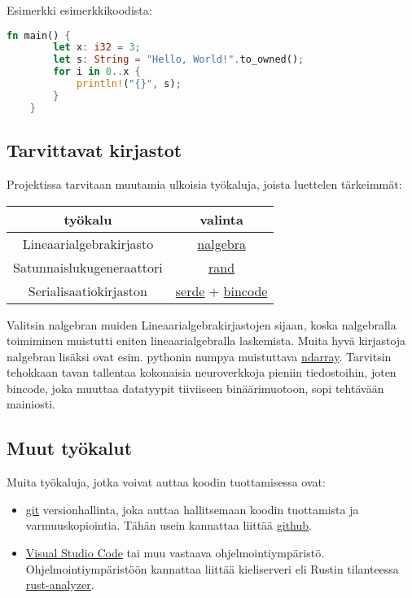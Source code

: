 \documentclass{article}
\begin{document}
Esimerkki esimerkkikoodista:
\begin{lstlisting}[language=Rust, style=boxed]
    fn main() {
        let x: i32 = 3;
        let s: String = "Hello, World!".to_owned();
        for i in 0..x {
            println!("{}", s);
        }
    }
\end{lstlisting}

\subsection{Tarvittavat kirjastot}

Projektissa tarvitaan muutamia ulkoisia työkaluja, joista luettelen tärkeimmät:

\begin{center}
    \begin{tabular}{ |c|c| }
        \hline
        työkalu                   & valinta                                                                                                     \\
        \hline
        Lineaarialgebrakirjasto   & \href{https://nalgebra.org/}{nalgebra}                                                                      \\
        Satunnaislukugeneraattori & \href{https://docs.rs/rand/latest/rand/}{rand}                                                              \\
        Serialisaatiokirjaston    & \href{https://docs.rs/serde/latest/serde/}{serde} + \href{https://docs.rs/bincode/latest/bincode/}{bincode} \\
        \hline
    \end{tabular}
\end{center}
Valitsin nalgebran muiden Lineaarialgebrakirjastojen sijaan, koska nalgebralla toimiminen muistutti eniten lineaarialgebralla laskemista.
Muita hyvä kirjastoja nalgebran lisäksi ovat esim. pythonin numpya muistuttava \href{https://docs.rs/ndarray/latest/ndarray}{ndarray}.
Tarvitsin tehokkaan tavan tallentaa kokonaisia neuroverkkoja pieniin tiedostoihin, joten bincode, joka muuttaa datatyypit tiiviiseen binäärimuotoon, sopi tehtävään mainiosti.

\subsection{Muut työkalut}

Muita työkaluja, jotka voivat auttaa koodin tuottamisessa ovat:

\begin{itemize}
    \item \href{https://git-scm.com/}{git} versionhallinta, joka auttaa hallitsemaan koodin tuottamista ja varmuuskopiointia. Tähän usein kannattaa liittää \href{https://github.com}{github}.
    \item \href{https://code.visualstudio.com/}{Visual Studio Code} tai muu vastaava ohjelmointiympäristö. Ohjelmointiympäristöön kannattaa liittää kieliserveri eli Rustin tilanteessa \href{https://rust-analyzer.github.io/}{rust-analyzer}.
\end{itemize}
\end{document}
